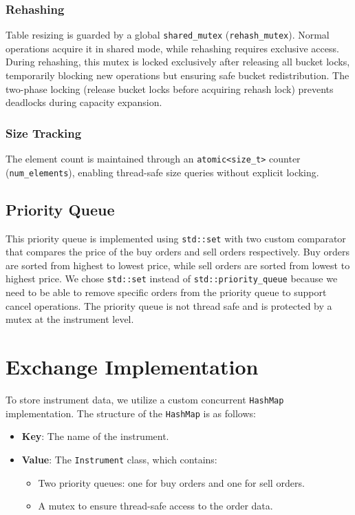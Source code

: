 \documentclass[11pt]{article}
\begin{document}
\subsubsection{Rehashing}
Table resizing is guarded by a global \texttt{shared\_mutex} (\texttt{rehash\_mutex}). Normal
operations acquire it in shared mode, while rehashing requires exclusive access. During rehashing, this mutex is locked exclusively after releasing all bucket locks, temporarily blocking new operations but ensuring safe bucket redistribution. The two-phase locking (release bucket locks before acquiring rehash lock) prevents deadlocks during capacity expansion.

\subsubsection{Size Tracking}
The element count is maintained through an \texttt{atomic<size\_t>} counter (\texttt{num\_elements}), enabling thread-safe size queries without explicit locking.


\subsection{Priority Queue}\label{sub:Priority Queue} %
This priority queue is implemented using \verb|std::set| with two custom comparator that
compares the price of the buy orders and sell orders respectively. Buy orders are sorted from
highest to lowest price, while sell orders are sorted from lowest to highest price. We chose
\verb|std::set| instead of \verb|std::priority_queue| because we need to be able to remove specific
orders from the priority queue to support cancel operations. The priority queue is not thread safe
and is protected by a mutex at the instrument level.



\section{Exchange Implementation}\label{sec:Exchange Implementation} %

To store instrument data, we utilize a custom concurrent \texttt{HashMap} implementation. The structure of the \texttt{HashMap} is as follows:

\begin{itemize}
    \item \textbf{Key}: The name of the instrument.
    \item \textbf{Value}: The \texttt{Instrument} class, which contains:
    \begin{itemize}
        \item Two priority queues: one for buy orders and one for sell orders.
        \item A mutex to ensure thread-safe access to the order data.
    \end{itemize}
\end{itemize}
\end{document}
